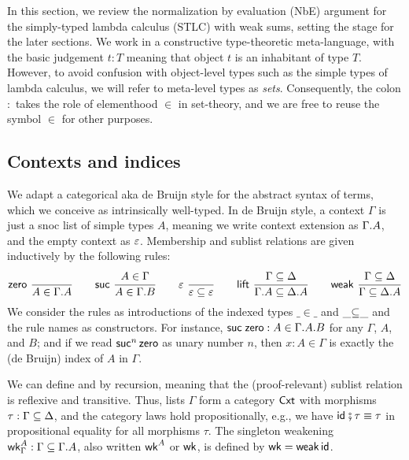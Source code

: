 \documentclass[a4paper,USenglish,cleveref, autoref]{lipics-v2019}
\begin{document}
In this section, we review the normalization by evaluation (NbE)
argument for the simply-typed lambda calculus (STLC) with weak sums, setting
the stage for the later sections.
%
We work in a constructive type-theoretic meta-language, with the basic judgement
$t : T$ meaning that object $t$ is an inhabitant of type $T$.
However, to avoid confusion with object-level types such as the simple
types of lambda calculus, we will refer to meta-level types as
\emph{sets}.  Consequently, the colon $:$
takes the role of elementhood $\in$ in set-theory, and we are free to
reuse the symbol $\in$ for other purposes.

\subsection{Contexts and indices}

We adapt a categorical aka de Bruijn style for the abstract syntax of
terms, which we conceive as intrinsically well-typed.  In de Bruijn
style, a context $\Gamma$ is just a snoc list of simple types $A$,
meaning we write context extension as $\Gamma.A$, and the empty
context as $\varepsilon$.  Membership  and sublist
relations \fbox{$\Gamma \sublist \Delta$} are given inductively by the
following rules:
\begin{gather*}
  \nru{\tzero}{}{A \in \cext \Gamma A}
\qquad
  \nru{\tsuc}{A \in \Gamma}{A \in \cext \Gamma B}
\qquad
  \nru{\tdone}{}{\cempty \sublist \cempty}
\qquad
  \nru{\tlift}
    {\Gamma \sublist \Delta}
    {\cext \Gamma A \sublist \cext \Delta A}
\qquad
  \nru{\tweak}
    {\Gamma \sublist \Delta}
    {\Gamma \sublist \cext \Delta A}
\end{gather*}
We consider the rules as introductions of the indexed types
$\_{\in}\_$ and $\_{\subseteq}\_$ and the rule names as constructors.
For instance, $\mathsf{\mathsf{suc}\;\mathsf{zero}} : A \in \Gamma.A.B$ for any
$\Gamma$, $A$, and $B$; and if we read $\mathsf{suc}^n\,\mathsf{zero}$ as unary
number $n$, then $x : A \in \Gamma$ is exactly the (de Bruijn) index
of $A$ in $\Gamma$.

We can define
\fbox{$\tid : \Gamma \sublist \Gamma$} and \fbox{$\_{\rcomp}\_ : \Gamma
\sublist \Delta \to \Delta \sublist \Phi \to \Gamma \sublist \Phi$}
by recursion, meaning that the (proof-relevant)
sublist relation is reflexive and transitive.
Thus, lists $\Gamma$ form a category
$\mathsf{Cxt}$ with morphisms $\tau : \Gamma \subseteq \Delta$, and the category laws
hold propositionally, e.g., we have $\mathsf{id}_{} \fatsemi \tau \equiv \tau$ in
propositional equality for all morphisms $\tau$.
The singleton weakening $\mathsf{wk}^A_\Gamma : \Gamma \subseteq \Gamma.A$,
also written $\mathsf{wk}^A$ or $\mathsf{wk}$, is defined by $\mathsf{wk} = \mathsf{weak}\,\mathsf{id}$.
\end{document}
